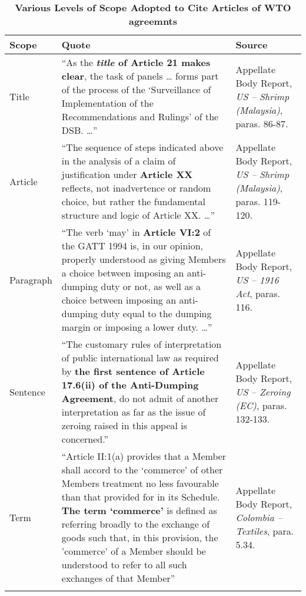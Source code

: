\begin{xltabular}{\linewidth}{lXX}
    \caption{\textbf{Various Levels of Scope Adopted to Cite Articles of WTO agreemnts}}\\
    \hline
    \textbf{\normalsize Scope} 
    & \textbf{\normalsize Quote}
    & \textbf{\normalsize Source}
    \\
    \endfirsthead
    \hline \hline
    Title
    & ``As the \textbf{\textit{title}
    of Article 21 makes clear}, 
    the task of panels \ldots
    forms part of the process
    of the `Surveillance of 
    Implementation of the 
    Recommendations and Rulings' of the
    DSB. \ldots'' 
    & Appellate Body Report, \textit{US – Shrimp (Malaysia)}, paras. 86-87.
    \\
    \hline
    Article 
    &  ``The sequence of steps indicated above in the analysis of a claim of justification under \textbf{Article XX} reflects, not inadvertence or random choice, but rather the fundamental structure and logic of Article XX. \ldots''
    & Appellate Body Report, \textit{US – Shrimp (Malaysia)}, paras. 119-120.
    \\
    \hline
    Paragraph
    &  ``The verb `may' in \textbf{Article VI:2} of the GATT 1994 is, in our opinion, properly
    understood as giving Members a choice between imposing an anti-dumping duty or
    not, as well as a choice between imposing an anti-dumping duty equal to the dumping
    margin or imposing a lower duty. \ldots''
    & Appellate Body Report, \textit{US – 1916 Act}, paras. 116.     
    \\
    \hline
    Sentence 
    & ``The customary rules of interpretation of public international law as
    required by \textbf{the first sentence of Article 17.6(ii) of the Anti-Dumping Agreement}, do
    not admit of another interpretation as far as the issue of zeroing raised in this appeal
    is concerned.''
    & Appellate Body Report, \textit{US – Zeroing (EC)}, paras. 132-133.
    \\
    \hline
    Term
    & ``Article II:1(a) provides that a
    Member shall accord to the `commerce' of other Members treatment no less
    favourable than that provided for in its Schedule. \textbf{The term `commerce'} is defined as
    referring broadly to the exchange of goods such that, in this provision, the 'commerce'
    of a Member should be understood to refer to all such exchanges of that Member''
    & Appellate Body Report, \textit{Colombia – Textiles}, para. 5.34.
    \\
    \hline
    \label{xltabular:level-of-scopes}
\end{xltabular}


